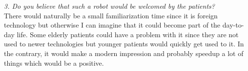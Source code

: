 \documentclass[plainarticle,zihtitle,english,final,hyperref,utf8]{zihpub}
\begin{document}
\begin{appendices}
\newline
\textit{3. Do you believe that such a robot would be welcomed by the patients?}\\
\newline
There would naturally be a small familiarization time since it is foreign technology but otherwise I can imagine that it could become part of the day-to-day life. Some elderly patients could have a problem with it since they are not used to newer technologies but younger patients would quickly get used to it. In the contrary, it would make a modern impression and probably speedup a lot of things which would be a positive.
\end{appendices}
\end{document}
